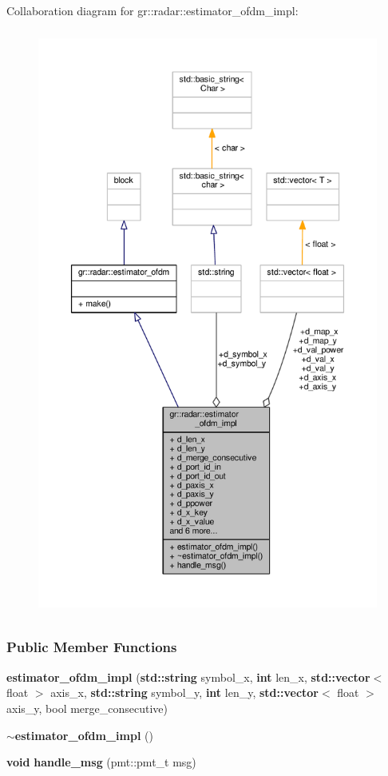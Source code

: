 Collaboration diagram for gr\+:\+:radar\+:\+:estimator\+\_\+ofdm\+\_\+impl\+:
\nopagebreak
\begin{figure}[H]
\begin{center}
\leavevmode
\includegraphics[height=550pt]{d1/d80/classgr_1_1radar_1_1estimator__ofdm__impl__coll__graph}
\end{center}
\end{figure}
\subsubsection*{Public Member Functions}
\begin{DoxyCompactItemize}
\item 
{\bf estimator\+\_\+ofdm\+\_\+impl} ({\bf std\+::string} symbol\+\_\+x, {\bf int} len\+\_\+x, {\bf std\+::vector}$<$ float $>$ axis\+\_\+x, {\bf std\+::string} symbol\+\_\+y, {\bf int} len\+\_\+y, {\bf std\+::vector}$<$ float $>$ axis\+\_\+y, bool merge\+\_\+consecutive)
\item 
{\bf $\sim$estimator\+\_\+ofdm\+\_\+impl} ()
\item 
{\bf void} {\bf handle\+\_\+msg} (pmt\+::pmt\+\_\+t msg)
\end{DoxyCompactItemize}
